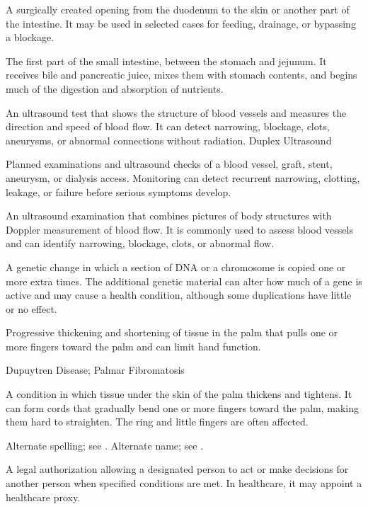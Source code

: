  A surgically created opening from the duodenum to the skin or another part of the intestine. It may be used in selected cases for feeding, drainage, or bypassing a blockage.

 The first part of the small intestine, between the stomach and jejunum. It receives bile and pancreatic juice, mixes them with stomach contents, and begins much of the digestion and absorption of nutrients.

 An ultrasound test that shows the structure of blood vessels and measures the direction and speed of blood flow. It can detect narrowing, blockage, clots, aneurysms, or abnormal connections without radiation.
\synonyms
Duplex Ultrasound

 Planned examinations and ultrasound checks of a blood vessel, graft, stent, aneurysm, or dialysis access. Monitoring can detect recurrent narrowing, clotting, leakage, or failure before serious symptoms develop.

 An ultrasound examination that combines pictures of body structures with Doppler measurement of blood flow. It is commonly used to assess blood vessels and can identify narrowing, blockage, clots, or abnormal flow.

 A genetic change in which a section of DNA or a chromosome is copied one or more extra times. The additional genetic material can alter how much of a gene is active and may cause a health condition, although some duplications have little or no effect.

 Progressive thickening and shortening of tissue in the palm that pulls one or more fingers toward the palm and can limit hand function.

\synonyms
Dupuytren Disease; Palmar Fibromatosis

 A condition in which tissue under the skin of the palm thickens and tightens. It can form cords that gradually bend one or more fingers toward the palm, making them hard to straighten. The ring and little fingers are often affected.


 Alternate spelling; see .
 Alternate name; see .


 A legal authorization allowing a designated person to act or make decisions for another person when specified conditions are
met. In healthcare, it may appoint a healthcare proxy.

